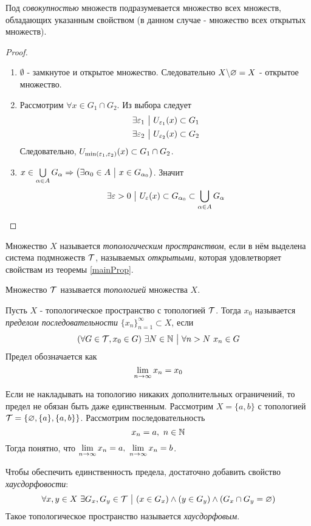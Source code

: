 \begin{note}
	Под \textit{совокупностью} множеств подразумевается множество всех множеств, обладающих указанным свойством (в данном случае - множество всех открытых множеств).
\end{note}

\begin{proof}~
	\begin{enumerate}
		\item $\emptyset$ - замкнутое и открытое множество. Следовательно $X \backslash \varnothing = X$ - открытое множество.
		
		\item Рассмотрим $\forall x \in G_1 \cap G_2$. Из выбора следует
		\begin{align*}
			&\exists \varepsilon_1 \ \big|\  U_{\varepsilon_1}(x) \subset G_1
			\\
			&\exists \varepsilon_2 \ \big|\  U_{\varepsilon_2}(x) \subset G_2 
		\end{align*}
		Следовательно, $U_{\min(\varepsilon_1, \varepsilon_2)}(x) \subset G_1 \cap G_2$.
		
		\item $x \in \bigcup\limits_{\alpha \in A} G_\alpha \Rightarrow \left(\exists \alpha_0 \in A \ \big|\  x \in G_{\alpha_0}\right)$. Значит
		\[
			\exists \varepsilon > 0 \ \big|\  U_\varepsilon(x) \subset G_{\alpha_0} \subset \bigcup\limits_{\alpha \in A} G_{\alpha}
		\]
	\end{enumerate}
\end{proof}

\begin{definition}
	Множество $X$ называется \textit{топологическим пространством}, если в нём выделена система подмножеств $\mathcal{T}$, называемых \textit{открытыми}, которая удовлетворяет свойствам из теоремы \ref{mainProp}.
	
	Множество $\mathcal{T}$ называется \textit{топологией} множества $X$.
\end{definition}

\begin{definition}
	Пусть $X$ - топологическое пространство с топологией $\mathcal{T}$. Тогда $x_0$ называется \textit{пределом последовательности} $\{x_n\}_{n = 1}^\infty \subset X$, если
	\[
		(\forall G \in \Tau, x_0 \in G)\ \exists N \in \N \such \forall n > N\ x_n \in G
	\]
	Предел обозначается как
	\[
		\lim\limits_{n \to \infty} x_n = x_0
	\]
\end{definition}

\begin{example}
	Если не накладывать на топологию никаких дополнительных ограничений, то предел не обязан быть даже единственным. Рассмотрим $X = \{a, b\}$ с топологией $\mathcal{T} = \{\varnothing, \{a\}, \{a, b\}\}$. Рассмотрим последовательность
	\[
		x_n = a,\ n \in \mathbb{N}
	\]
	Тогда понятно, что $\lim\limits_{n \to \infty} x_n = a,\ \lim\limits_{n \to \infty} x_n = b$.
\end{example}

\begin{anote}
	Чтобы обеспечить единственность предела, достаточно добавить свойство \textit{хаусдорфовости}:
	\[
		\forall x, y \in X\ \exists G_x, G_y \in \mathcal{T} \ \big|\  (x \in G_x) \wedge (y \in G_y) \wedge (G_x \cap G_y = \varnothing)
	\]
	Такое топологическое пространство называется \textit{хаусдорфовым}.
\end{anote}